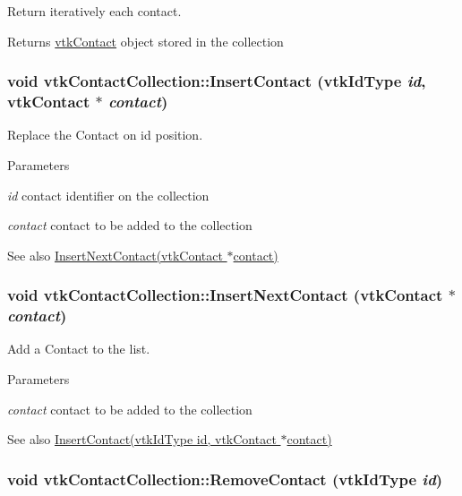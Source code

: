 Return iteratively each contact. \begin{DoxyReturn}{Returns}
\hyperlink{classvtkContact}{vtkContact} object stored in the collection 
\end{DoxyReturn}
\hypertarget{classvtkContactCollection_a0e50a84b758bf14a4936fffb51a39287}{
\subsubsection[{InsertContact}]{\setlength{\rightskip}{0pt plus 5cm}void vtkContactCollection::InsertContact (vtkIdType {\em id}, \/  {\bf vtkContact} $\ast$ {\em contact})}}
\label{classvtkContactCollection_a0e50a84b758bf14a4936fffb51a39287}


Replace the Contact on id position. 
\begin{DoxyParams}{Parameters}
\item[{\em id}]contact identifier on the collection \item[{\em contact}]contact to be added to the collection \end{DoxyParams}
\begin{DoxySeeAlso}{See also}
\hyperlink{classvtkContactCollection_a5ef415a23ede7e5f198a94380c9eec44}{InsertNextContact(vtkContact $\ast$contact)} 
\end{DoxySeeAlso}
\hypertarget{classvtkContactCollection_a5ef415a23ede7e5f198a94380c9eec44}{
\subsubsection[{InsertNextContact}]{\setlength{\rightskip}{0pt plus 5cm}void vtkContactCollection::InsertNextContact ({\bf vtkContact} $\ast$ {\em contact})}}
\label{classvtkContactCollection_a5ef415a23ede7e5f198a94380c9eec44}


Add a Contact to the list. 
\begin{DoxyParams}{Parameters}
\item[{\em contact}]contact to be added to the collection \end{DoxyParams}
\begin{DoxySeeAlso}{See also}
\hyperlink{classvtkContactCollection_a0e50a84b758bf14a4936fffb51a39287}{InsertContact(vtkIdType id, vtkContact $\ast$contact)} 
\end{DoxySeeAlso}
\hypertarget{classvtkContactCollection_acb592cfee4ec93e6580d5a44da8b85c3}{
\subsubsection[{RemoveContact}]{\setlength{\rightskip}{0pt plus 5cm}void vtkContactCollection::RemoveContact (vtkIdType {\em id})}}
\label{classvtkContactCollection_acb592cfee4ec93e6580d5a44da8b85c3}


